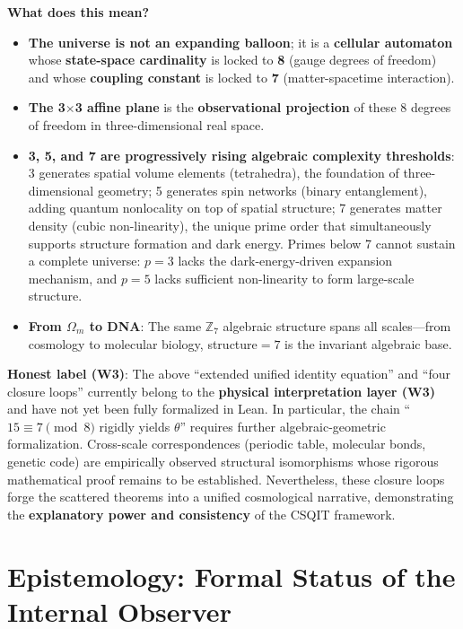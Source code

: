 \documentclass[aps,prd,twocolumn,nofootinbib,floatfix]{revtex4-2}
\begin{document}
\textbf{What does this mean?}
\begin{itemize}
    \item \textbf{The universe is not an expanding balloon}; it is a \textbf{cellular automaton} whose \textbf{state-space cardinality} is locked to \textbf{8} (gauge degrees of freedom) and whose \textbf{coupling constant} is locked to \textbf{7} (matter-spacetime interaction).
    \item \textbf{The 3$\times$3 affine plane} is the \textbf{observational projection} of these 8 degrees of freedom in three-dimensional real space.
    \item \textbf{3, 5, and 7 are progressively rising algebraic complexity thresholds}: 3 generates spatial volume elements (tetrahedra), the foundation of three-dimensional geometry; 5 generates spin networks (binary entanglement), adding quantum nonlocality on top of spatial structure; 7 generates matter density (cubic non-linearity), the unique prime order that simultaneously supports structure formation and dark energy. Primes below 7 cannot sustain a complete universe: $p=3$ lacks the dark-energy-driven expansion mechanism, and $p=5$ lacks sufficient non-linearity to form large-scale structure.
    \item \textbf{From $\Omega_m$ to DNA}: The same $\mathbb{Z}_7$ algebraic structure spans all scales---from cosmology to molecular biology, structure$=7$ is the invariant algebraic base.
\end{itemize}

\medskip

\noindent\textbf{Honest label (W3)}: The above ``extended unified identity equation'' and ``four closure loops'' currently belong to the \textbf{physical interpretation layer (W3)} and have not yet been fully formalized in Lean. In particular, the chain ``$15 \equiv 7 \pmod 8$ rigidly yields $\theta$'' requires further algebraic-geometric formalization. Cross-scale correspondences (periodic table, molecular bonds, genetic code) are empirically observed structural isomorphisms whose rigorous mathematical proof remains to be established. Nevertheless, these closure loops forge the scattered theorems into a unified cosmological narrative, demonstrating the \textbf{explanatory power and consistency} of the CSQIT framework.

\section{Epistemology: Formal Status of the Internal Observer}
\end{document}
